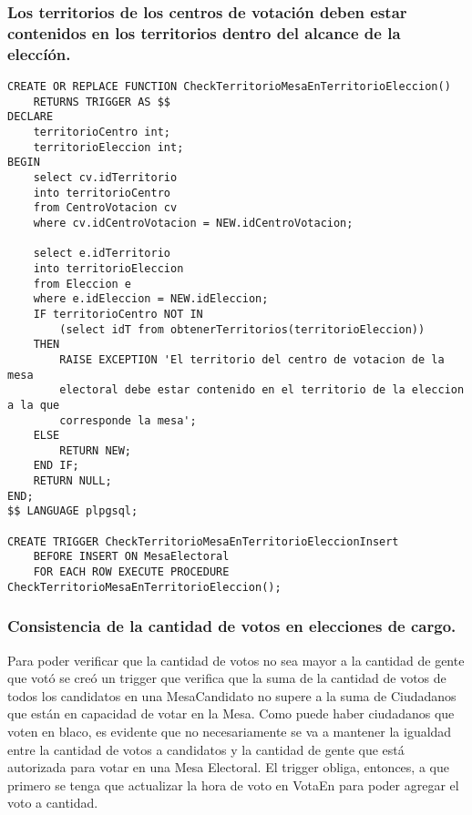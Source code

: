 \subsubsection{Los territorios de los centros de votación deben estar contenidos en los territorios dentro del alcance de la eleccíón.}

\begin{verbatim}
CREATE OR REPLACE FUNCTION CheckTerritorioMesaEnTerritorioEleccion() 
    RETURNS TRIGGER AS $$
DECLARE
    territorioCentro int;
    territorioEleccion int;
BEGIN
    select cv.idTerritorio 
    into territorioCentro 
    from CentroVotacion cv 
    where cv.idCentroVotacion = NEW.idCentroVotacion;
    
    select e.idTerritorio 
    into territorioEleccion 
    from Eleccion e 
    where e.idEleccion = NEW.idEleccion;
    IF territorioCentro NOT IN 
        (select idT from obtenerTerritorios(territorioEleccion))
    THEN
        RAISE EXCEPTION 'El territorio del centro de votacion de la mesa 
        electoral debe estar contenido en el territorio de la eleccion a la que 
        corresponde la mesa';
    ELSE
        RETURN NEW;
    END IF;
    RETURN NULL;
END;
$$ LANGUAGE plpgsql;

CREATE TRIGGER CheckTerritorioMesaEnTerritorioEleccionInsert
    BEFORE INSERT ON MesaElectoral
    FOR EACH ROW EXECUTE PROCEDURE CheckTerritorioMesaEnTerritorioEleccion();
\end{verbatim}

\subsubsection{Consistencia de la cantidad de votos en elecciones de cargo.}

\indent Para poder verificar que la cantidad de votos no sea mayor a la cantidad de gente que votó se creó un trigger que verifica que la suma de la cantidad de votos de todos los candidatos en una MesaCandidato no supere a la suma de Ciudadanos que están en capacidad de votar en la Mesa. Como puede haber ciudadanos que voten en blaco, es evidente que no necesariamente se va a mantener la igualdad entre la cantidad de votos a candidatos y la cantidad de gente que está autorizada para votar en una Mesa Electoral.
\indent El trigger obliga, entonces, a que primero se tenga que actualizar la hora de voto en VotaEn para poder agregar el voto a cantidad.\\ 


